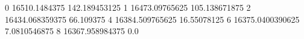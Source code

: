 0 16510.1484375 142.189453125
1 16473.09765625 105.138671875
2 16434.068359375 66.109375
4 16384.509765625 16.55078125
6 16375.0400390625 7.0810546875
8 16367.958984375 0.0
